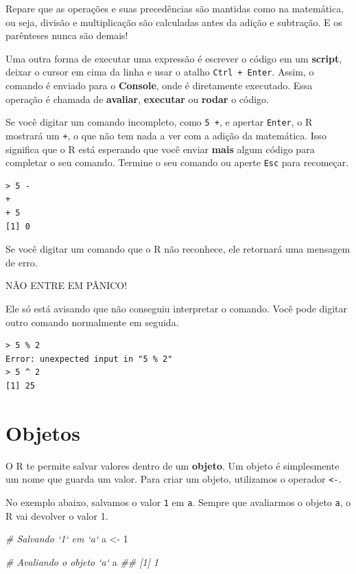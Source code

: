 \documentclass[]{book}
\newenvironment{Shaded}{\begin{snugshade}}{\end{snugshade}}
\newcommand{\CommentTok}[1]{\textcolor[rgb]{0.56,0.35,0.01}{\textit{#1}}}
\newcommand{\DecValTok}[1]{\textcolor[rgb]{0.00,0.00,0.81}{#1}}
\newcommand{\NormalTok}[1]{#1}
\newcommand{\StringTok}[1]{\textcolor[rgb]{0.31,0.60,0.02}{#1}}
\begin{document}
Repare que as operações e suas precedências são mantidas como na matemática, ou seja, divisão e multiplicação são calculadas antes da adição e subtração. E os parênteses nunca são demais!

Uma outra forma de executar uma expressão é escrever o código em um \textbf{script}, deixar o cursor em cima da linha e usar o atalho \texttt{Ctrl\ +\ Enter}. Assim, o comando é enviado para o \textbf{Console}, onde é diretamente executado. Essa operação é chamada de \textbf{avaliar}, \textbf{executar} ou \textbf{rodar} o código.

Se você digitar um comando incompleto, como \texttt{5\ +}, e apertar \texttt{Enter}, o R mostrará um \texttt{+}, o que não tem nada a ver com a adição da matemática. Isso significa que o R está esperando que você enviar \textbf{mais} algum código para completar o seu comando. Termine o seu comando ou aperte \texttt{Esc} para recomeçar.

\begin{verbatim}
> 5 -
+ 
+ 5
[1] 0
\end{verbatim}

Se você digitar um comando que o R não reconhece, ele retornará uma mensagem de erro.

NÃO ENTRE EM PÂNICO!

Ele só está avisando que não conseguiu interpretar o comando. Você pode digitar outro comando normalmente em seguida.

\begin{verbatim}
> 5 % 2
Error: unexpected input in "5 % 2"
> 5 ^ 2
[1] 25
\end{verbatim}

\hypertarget{objetos}{%
\section{Objetos}\label{objetos}}

O R te permite salvar valores dentro de um \textbf{objeto}. Um objeto é simplesmente um nome que guarda um valor. Para criar um objeto, utilizamos o operador \texttt{\textless{}-}.

No exemplo abaixo, salvamos o valor \texttt{1} em \texttt{a}. Sempre que avaliarmos o objeto \texttt{a}, o R vai devolver o valor 1.

\begin{Shaded}
\begin{Highlighting}[]
\CommentTok{# Salvando `1` em `a`}
\NormalTok{a <-}\StringTok{ }\DecValTok{1}

\CommentTok{# Avaliando o objeto `a`}
\NormalTok{a}
\CommentTok{## [1] 1}
\end{Highlighting}
\end{Shaded}
\end{document}

